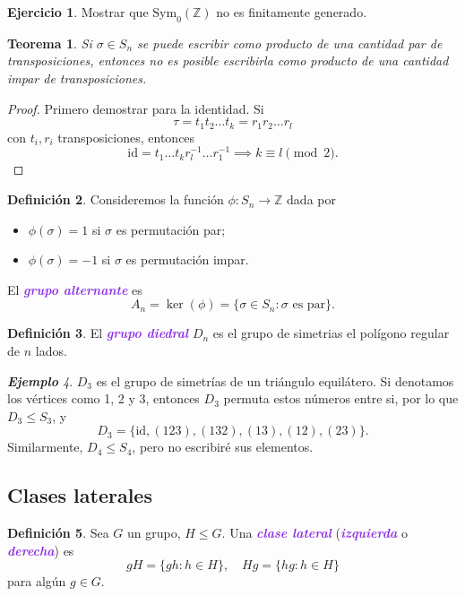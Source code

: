 \documentclass{article}
\newtheorem{theorem}{Teorema}[section]
\theoremstyle{definition}
\newtheorem{definition}[theorem]{Definición}
\newtheorem{exercise}{Ejercicio}
\theoremstyle{remark}
\newtheorem{example}[theorem]{\textbf{Ejemplo}}
\numberwithin{equation}{section}
\newcommand{\Z}{\mathbb{Z}}
\newcommand{\id}{\mathrm{id}}
\newcommand{\Sym}{\mathrm{Sym}}
\newcommand{\wea}[1]{\textcolor{BlueViolet}{\textbf{\emph{#1}}}}
\begin{document}
\begin{exercise}
  Mostrar que $\Sym_0(\Z)$ no es finitamente generado.
\end{exercise}

\begin{theorem}
  Si $\sigma \in S_n$ se puede escribir como producto de una cantidad par de transposiciones, entonces no es posible escribirla como producto de una cantidad impar de transposiciones.
\end{theorem}
\begin{proof}
  Primero demostrar para la identidad. %
  Si
  \[\tau = t_1 t_2 \dots t_k = r_1 r_2 \dots r_l\]
  con $t_i, r_i$ transposiciones, entonces
  \[\id = t_1 \dots t_k r_l^{-1} \dots r_1^{-1}
  \implies k \equiv l \pmod 2.\]
\end{proof}

\begin{definition}
  Consideremos la función $\phi \colon S_n \to \Z$ dada por
  \begin{itemize}
    \item $\phi(\sigma) = 1$ si $\sigma$ es permutación par;
    \item $\phi(\sigma) = -1$ si $\sigma$ es permutación impar.
  \end{itemize}
  El \wea{grupo alternante} es
  \[A_n = \ker(\phi) = \{\sigma \in S_n \colon \sigma \text{ es par}\}.\]
\end{definition}

\begin{definition}
  El \wea{grupo diedral} $D_n$ es el grupo de simetrias el polígono regular de $n$ lados.
\end{definition}

\begin{example}
  $D_3$ es el grupo de simetrías de un triángulo equilátero. Si denotamos los vértices como 1, 2 y 3, entonces $D_3$ permuta estos números entre si, por lo que $D_3 \leqslant S_3$, y
  \[D_3 = \{\id, (123), (132), (13), (12), (23)\}.\]
  Similarmente, $D_4 \leqslant S_4$, pero no escribiré sus elementos.
\end{example}

\newpage
\subsection{Clases laterales}

\begin{definition}
  Sea $G$ un grupo, $H \leqslant G$. Una \wea{clase lateral} (\wea{izquierda} o \wea{derecha}) es
  \[gH = \{gh \colon h \in H\}, \quad Hg = \{hg \colon h \in H\}\]
  para algún $g \in G$.
\end{definition}
\end{document}
